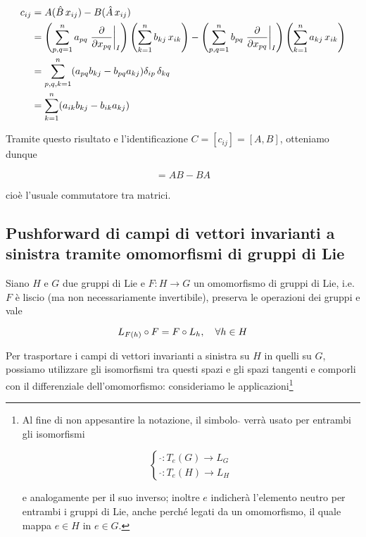 \begin{align}
	\begin{split}
		c_{ij} &= A (\hat{B} \, x_{ij}) - B (\hat{A} \, x_{ij})\\
		&= \left( \sum_{p,q=1}^{n} a_{pq} \eval{ \pdv{x_{pq}} }_{I} \right) \left( \displaystyle\sum_{k=1}^{n} b_{kj} \, x_{ik} \right) - \left( \sum_{p,q=1}^{n} b_{pq} \eval{ \pdv{x_{pq}} }_{I} \right) \left( \displaystyle\sum_{k=1}^{n} a_{kj} \, x_{ik} \right)\\
		&= \sum_{p,q,k=1}^{n} ( a_{pq} b_{kj} - b_{pq} a_{kj} ) \delta_{ip} \, \delta_{kq}\\
		&= \sum_{k=1}^{n} ( a_{ik} b_{kj} - b_{ik} a_{kj} )
	\end{split}
\end{align}

Tramite questo risultato e l'identificazione $ C = [c_{ij}] = [A,B] $, otteniamo dunque

\begin{equation}
	[A,B] = A B - B A
\end{equation}

cioè l'usuale commutatore tra matrici.

\subsection{Pushforward di campi di vettori invarianti a sinistra tramite omomorfismi di gruppi di Lie}

Siano $ H $ e $ G $ due gruppi di Lie e $ F : H \to G $ un omomorfismo di gruppi di Lie, i.e. $ F $ è liscio (ma non necessariamente invertibile), preserva le operazioni dei gruppi e vale

\begin{equation}
	L_{F(h)} \circ F = F \circ L_{h} \qcomma \forall h \in H
\end{equation}

Per trasportare i campi di vettori invarianti a sinistra su $ H $ in quelli su $ G $, possiamo utilizzare gli isomorfismi tra questi spazi e gli spazi tangenti e comporli con il differenziale dell'omomorfismo: consideriamo le applicazioni\footnote{%
	Al fine di non appesantire la notazione, il simbolo $ \hat{} $ verrà usato per entrambi gli isomorfismi
	
	\begin{equation}
		\begin{cases}
			\hat{} : T_{e}(G) \to L_{G}\\
			\hat{} : T_{e}(H) \to L_{H}
		\end{cases}
	\end{equation}
	
	e analogamente per il suo inverso; inoltre $ e $ indicherà l'elemento neutro per entrambi i gruppi di Lie, anche perché legati da un omomorfismo, il quale mappa $ e \in H $ in $ e \in G $.%
}

